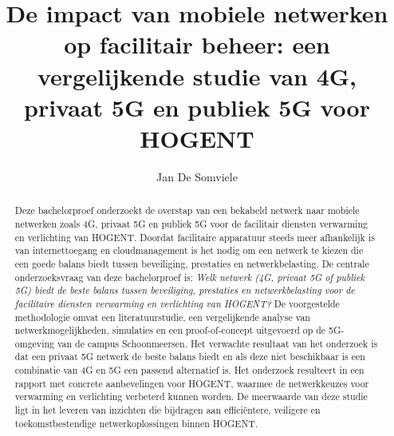 \documentclass{hogent-article}
\title{De impact van mobiele netwerken op facilitair beheer: een vergelijkende studie van 4G, privaat 5G en publiek 5G voor HOGENT}
\author{Jan De Somviele}
\begin{document}
\begin{abstract}
Deze bachelorproef onderzoekt de overstap van een bekabeld netwerk naar mobiele netwerken zoals 4G, privaat 5G en publiek 5G voor de facilitair diensten verwarming en verlichting van HOGENT. Doordat facilitaire apparatuur steeds meer afhankelijk is van internettoegang en cloudmanagement is het nodig om een netwerk te kiezen die een goede balans biedt tussen beveiliging, prestaties en netwerkbelasting. De centrale onderzoeksvraag van deze bachelorproef is: \textit{Welk netwerk (4G, privaat 5G of publiek 5G) biedt de beste balans tussen beveiliging, prestaties en netwerkbelasting voor de facilitaire diensten verwarming en verlichting van HOGENT?} De voorgestelde methodologie omvat een literatuurstudie, een vergelijkende analyse van netwerkmogelijkheden, simulaties en een proof-of-concept uitgevoerd op de 5G-omgeving van de campus Schoonmeersen. Het verwachte resultaat van het onderzoek is dat een privaat 5G netwerk de beste balans biedt en als deze niet beschikbaar is een combinatie van 4G en 5G een passend alternatief is. Het onderzoek resulteert in een rapport met concrete aanbevelingen voor HOGENT, waarmee de netwerkkeuzes voor verwarming en verlichting verbeterd kunnen worden. De meerwaarde van deze studie ligt in het leveren van inzichten die bijdragen aan efficiëntere, veiligere en toekomstbestendige netwerkoplossingen binnen HOGENT.
\end{abstract}

\tableofcontents



\printbibliography[heading=bibintoc]
\end{document}
